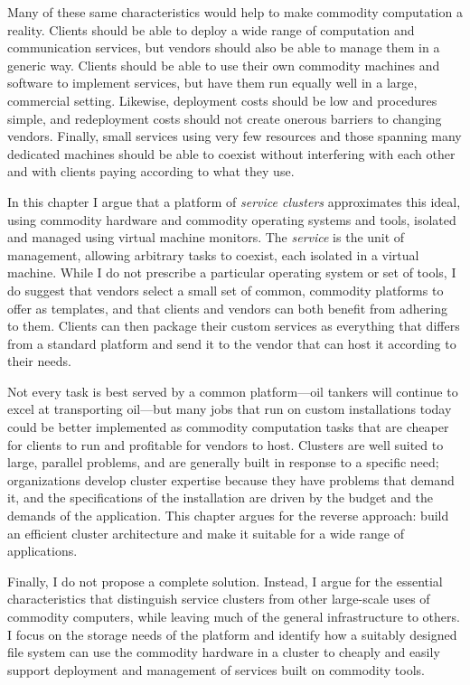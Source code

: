 Many of these same characteristics would help to make commodity computation a reality. Clients should be able to deploy a wide range of computation and communication services, but vendors should also be able to manage them in a generic way. Clients should be able to use their own commodity machines and software to implement services, but have them run equally well in a large, commercial setting. Likewise, deployment costs should be low and procedures simple, and redeployment costs should not create onerous barriers to changing vendors. Finally, small services using very few resources and those spanning many dedicated machines should be able to coexist without interfering with each other and with clients paying according to what they use.

In this chapter I argue that a platform of \emph{service clusters} approximates this ideal, using commodity hardware and commodity operating systems and tools, isolated and managed using virtual machine monitors. The \emph{service} is the unit of management, allowing arbitrary tasks to coexist, each isolated in a virtual machine. While I do not prescribe a particular operating system or set of tools, I do suggest that vendors select a small set of common, commodity platforms to offer as templates, and that clients and vendors can both benefit from adhering to them. Clients can then package their custom services as everything that differs from a standard platform and send it to the vendor that can host it according to their needs.

Not every task is best served by a common platform---oil tankers will continue to excel at transporting oil---but many jobs that run on custom installations today could be better implemented as commodity computation tasks that are cheaper for clients to run and profitable for vendors to host. Clusters are well suited to large, parallel problems, and are generally built in response to a specific need; organizations develop cluster expertise because they have problems that demand it, and the specifications of the installation are driven by the budget and the demands of the application. This chapter argues for the reverse approach: build an efficient cluster architecture and make it suitable for a wide range of applications.

Finally, I do not propose a complete solution. Instead, I argue for the essential characteristics that distinguish service clusters from other large-scale uses of commodity computers, while leaving much of the general infrastructure to others. I focus on the storage needs of the platform and identify how a suitably designed file system can use the commodity hardware in a cluster to cheaply and easily support deployment and management of services built on commodity tools.

